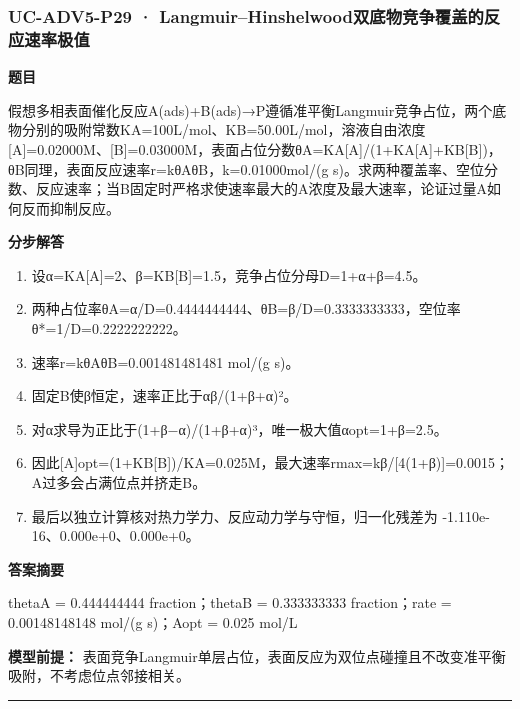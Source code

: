 \documentclass[UTF8,11pt,a4paper]{ctexart}
\begin{document}
\subsubsection*{UC-ADV5-P29 · Langmuir–Hinshelwood双底物竞争覆盖的反应速率极值}
\noindent\textbf{题目}\par
假想多相表面催化反应A(ads)+B(ads)→P遵循准平衡Langmuir竞争占位，两个底物分别的吸附常数KA=100L/mol、KB=50.00L/mol，溶液自由浓度[A]=0.02000M、[B]=0.03000M，表面占位分数θA=KA[A]/(1+KA[A]+KB[B])，θB同理，表面反应速率r=kθAθB，k=0.01000mol/(g s)。求两种覆盖率、空位分数、反应速率；当B固定时严格求使速率最大的A浓度及最大速率，论证过量A如何反而抑制反应。\par
\medskip\noindent\textbf{分步解答}
\begin{enumerate}
\item 设α=KA[A]=2、β=KB[B]=1.5，竞争占位分母D=1+α+β=4.5。
\item 两种占位率θA=α/D=0.4444444444、θB=β/D=0.3333333333，空位率θ*=1/D=0.2222222222。
\item 速率r=kθAθB=0.001481481481 mol/(g s)。
\item 固定B使β恒定，速率正比于αβ/(1+β+α)²。
\item 对α求导为正比于(1+β−α)/(1+β+α)³，唯一极大值αopt=1+β=2.5。
\item 因此[A]opt=(1+KB[B])/KA=0.025M，最大速率rmax=kβ/[4(1+β)]=0.0015；A过多会占满位点并挤走B。
\item 最后以独立计算核对热力学力、反应动力学与守恒，归一化残差为 -1.110e-16、0.000e+0、0.000e+0。
\end{enumerate}
\noindent\textbf{答案摘要}\par
thetaA = 0.444444444 fraction；thetaB = 0.333333333 fraction；rate = 0.00148148148 mol/(g s)；Aopt = 0.025 mol/L\par
\noindent\textbf{模型前提：}
表面竞争Langmuir单层占位，表面反应为双位点碰撞且不改变准平衡吸附，不考虑位点邻接相关。\par
\medskip\hrule\medskip
{}
\end{document}

